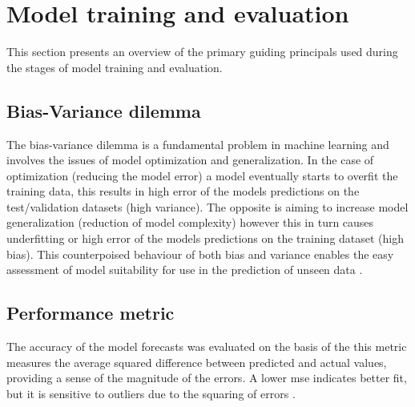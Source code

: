 \section{Model training and evaluation}\label{Model training and evaluation}

This section presents an overview of the primary guiding principals used during the stages of model training and evaluation.

\subsection{Bias-Variance dilemma}\label{Bias-Variance dilemma}

The bias-variance dilemma is a fundamental problem in machine learning and involves the issues of model optimization and generalization. In the case of optimization (reducing the model error) a model eventually starts to overfit the training data, this results in high error of the models predictions on the test/validation datasets (high variance). The opposite is aiming to increase model generalization (reduction of model complexity) however this in turn causes underfitting or high error of the models predictions on the training dataset (high bias). This counterpoised behaviour of both bias and variance enables the easy assessment of model suitability for use in the prediction of unseen data \cite{ibm-ensemble,ibm-regularization,svm-2}.

%
%

\subsection{Performance metric}\label{Performance metric}

The accuracy of the model forecasts was evaluated on the basis of the  this metric measures the average squared difference between predicted and actual values, providing a sense of the magnitude of the errors. A lower \gls{mse} indicates better fit, but it is sensitive to outliers due to the squaring of errors \cite{scikit-mse}.

